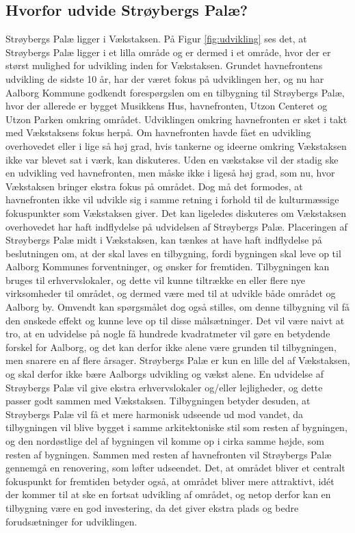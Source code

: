 \subsection{Hvorfor udvide Strøybergs Palæ?}
Strøybergs Palæ ligger i Vækstaksen. På Figur \ref{fig:udvikling} ses det, at Strøybergs Palæ ligger i et lilla område og er dermed i et område, hvor der er størst mulighed for udvikling inden for Vækstaksen. Grundet havnefrontens udvikling de sidste 10 år, har der været fokus på udviklingen her, og nu har Aalborg Kommune godkendt forespørgslen om en tilbygning til Strøybergs Palæ, hvor der allerede er bygget Musikkens Hus, havnefronten, Utzon Centeret og Utzon Parken omkring området. Udviklingen omkring havnefronten er sket i takt med Vækstaksens fokus herpå. Om havnefronten havde fået en udvikling overhovedet eller i lige så høj grad, hvis tankerne og ideerne omkring Vækstaksen ikke var blevet sat i værk, kan diskuteres. Uden en vækstakse vil der stadig ske en udvikling ved havnefronten, men måske ikke i ligeså høj grad, som nu, hvor Vækstaksen bringer ekstra fokus på området. Dog må det formodes, at havnefronten ikke vil udvikle sig i samme retning i forhold til de kulturmæssige fokuspunkter som Vækstaksen giver. 
\newline \indent{     }  Det kan ligeledes diskuteres om Vækstaksen overhovedet har haft indflydelse på udvidelsen af Strøybergs Palæ. Placeringen af Strøybergs Palæ midt i Vækstaksen, kan tænkes at have haft indflydelse på beslutningen om, at der skal laves en tilbygning, fordi bygningen skal leve op til Aalborg Kommunes forventninger, og ønsker for fremtiden. Tilbygningen kan bruges til erhvervslokaler, og dette vil kunne tiltrække en eller flere nye virksomheder til området, og dermed være med til at udvikle både området og Aalborg by. Omvendt kan spørgsmålet dog også stilles, om denne tilbygning vil få den ønskede effekt og kunne leve op til disse målsætninger. Det vil være naivt at tro, at en udvidelse på nogle få hundrede kvadratmeter vil gøre en betydende forskel for Aalborg, og det kan derfor ikke alene være grunden til tilbygningen, men snarere en af flere årsager. Strøybergs Palæ er kun en lille del af Vækstaksen, og skal derfor ikke bære Aalborgs udvikling og vækst alene.
\newline \indent{     }  En udvidelse af Strøybergs Palæ vil give ekstra erhvervslokaler og/eller lejligheder, og dette passer godt sammen med Vækstaksen. Tilbygningen betyder desuden, at Strøybergs Palæ vil få et mere harmonisk udseende ud mod vandet, da tilbygningen vil blive bygget i samme arkitektoniske stil som resten af bygningen, og den nordøstlige del af bygningen vil komme op i cirka samme højde, som resten af bygningen. Sammen med resten af havnefronten vil Strøybergs Palæ gennemgå en renovering, som løfter udseendet.
\newline \indent{     }  Det, at området bliver et centralt fokuspunkt for fremtiden betyder også, at området bliver mere attraktivt, idét der kommer til at ske en fortsat udvikling af området, og netop derfor kan en tilbygning være en god investering, da det giver ekstra plads og bedre forudsætninger for udviklingen.